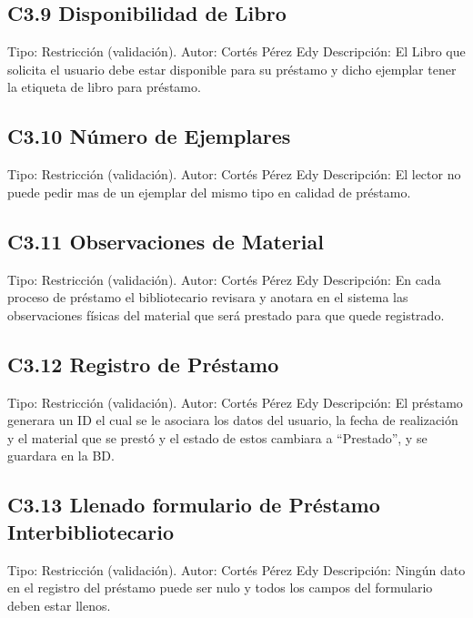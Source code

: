\subsection{C3.9 Disponibilidad de Libro }
	\UCli Tipo: Restricción (validación).
	\UCli Autor: Cortés Pérez Edy
	\UCli Descripción: El Libro que solicita el usuario debe estar disponible para su préstamo y dicho ejemplar tener la etiqueta de libro para préstamo.
	
\subsection{C3.10 Número de Ejemplares }
	\UCli Tipo: Restricción (validación).
	\UCli Autor: Cortés Pérez Edy
	\UCli Descripción: El lector no puede pedir mas de un ejemplar del mismo tipo en calidad de préstamo.
	
\subsection{C3.11 Observaciones de Material }
	\UCli Tipo: Restricción (validación).
	\UCli Autor: Cortés Pérez Edy
	\UCli Descripción: En cada proceso de préstamo el bibliotecario revisara y anotara en el sistema las observaciones físicas del material que será prestado para que quede registrado.
	
\subsection{C3.12 Registro de Préstamo }
	\UCli Tipo: Restricción (validación).
	\UCli Autor: Cortés Pérez Edy
	\UCli Descripción: El préstamo generara un ID el cual se le asociara los datos del usuario, la fecha de realización y el material que se prestó y el estado de estos cambiara a “Prestado”, y se guardara en la BD.
	
\subsection{C3.13 Llenado formulario de Préstamo Interbibliotecario }
	\UCli Tipo: Restricción (validación).
	\UCli Autor: Cortés Pérez Edy
	\UCli Descripción: Ningún dato en el registro del préstamo puede ser nulo y todos los campos del formulario deben estar llenos.
	
